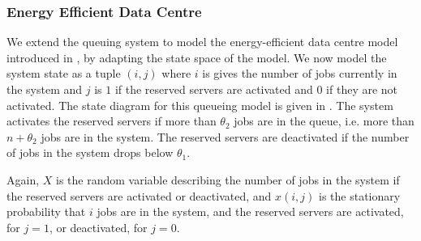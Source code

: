 \subsubsection*{Energy Efficient Data Centre}\label{sec:cloud:data_centers:modeling:energy_efficient}

We extend the queuing system to model the energy-efficient data centre model introduced in , by adapting the state space of the model.
We now model the system state as a tuple \((i,j)\) where \(i\) is gives the number of jobs currently in the system and \(j\) is \(1\) if the reserved servers are activated and \(0\) if they are not activated.
The state diagram for this queueing model is given in .
The system activates the reserved servers if more than \(\theta_2\) jobs are in the queue, i.e. more than \(n + \theta_2\) jobs are in the system.
The reserved servers are deactivated if the number of jobs in the system drops below \(\theta_1\).

Again, \(X\) is the random variable describing the number of jobs in the system if the reserved servers are activated or deactivated, and \(x(i, j)\) is the stationary probability that \(i\) jobs are in the system, and the reserved servers are activated, for \(j=1\), or deactivated, for \(j=0\). 

